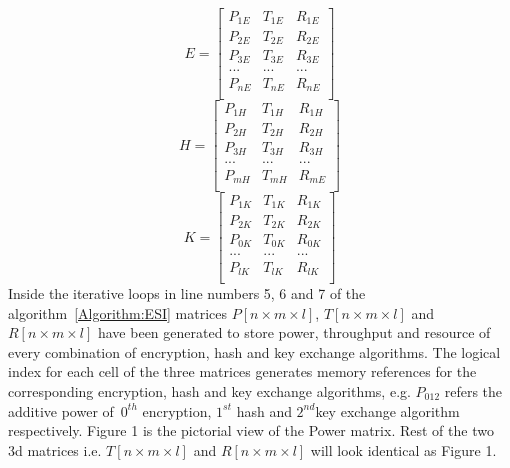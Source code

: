 \documentclass[3p,times]{elsarticle}
\begin{document}
 \[ E=
  \left[ {\begin{array}{ccc}
P_{1E} & T_{1E} & R_{1E} \\
P_{2E} & T_{2E} & R_{2E} \\
P_{3E} & T_{3E} & R_{3E}\\
... & ... & ... \\
   P_{nE} & T_{nE} & R_{nE} \\
  \end{array} } \right]
\]
\vspace{-2 pt}\[ H=
  \left[ {\begin{array}{ccc}
P_{1H} & T_{1H} & R_{1H} \\
P_{2H} & T_{2H} & R_{2H} \\
P_{3H} & T_{3H} & R_{3H}\\
... & ... & ... \\
P_{mH} & T_{mH} & R_{mE} \\
  \end{array} } \right]
\]
\vspace{-2 pt}
 \[ K=
  \left[ {\begin{array}{ccc}
P_{1K} & T_{1K} & R_{1K} \\
P_{2K} & T_{2K} & R_{2K} \\
P_{0K} & T_{0K} & R_{0K}\\
... & ... & ... \\
P_{lK} & T_{lK} & R_{lK} \\
  \end{array} } \right]
\]
Inside the iterative loops in line numbers 5, 6 and 7 of the algorithm~\ref{Algorithm:ESI} matrices $P[n\times m\times l]$, $T[n\times m\times l]$ and $R[n\times m\times l]$ have been generated to store power, throughput and resource of every combination of encryption, hash and key exchange algorithms. The logical index for each cell of the three matrices generates memory references for the corresponding encryption, hash and key exchange algorithms, e.g. $P_{012}$ refers the additive power of~$0^{th}$ encryption, $1^{st}$ hash and $2^{nd}$key exchange algorithm respectively. Figure 1 is the pictorial view of the Power matrix. Rest of the two 3d matrices i.e. $T[n\times m\times l]$ and $R[n\times m\times l]$ will look identical as Figure 1.
\end{document}

